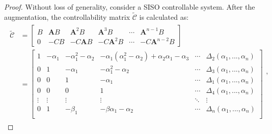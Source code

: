 \documentclass[a4paper,11pt]{book}
\numberwithin{figure}{chapter}
\numberwithin{equation}{chapter}
\numberwithin{table}{chapter}
\theoremstyle{definition}
\begin{document}
\begin{proof}
    Without loss of generality, consider a SISO controllable system. After the augmentation, the controllability matrix $\tilde{\bm{\mathcal{C}}}$ is calculated as:
    \begin{align}
    \begin{split}
        \tilde{\bm{\mathcal{C}}} &= \begin{bmatrix}
            B & \bm{A} B & \bm{A}^2 B & \bm{A}^3 B & \cdots & \bm{A}^{n-1} B \\
            0 & -C B & -C \bm{A} B & -C \bm{A}^2 B & \cdots & -C \bm{A}^{n-2} B
        \end{bmatrix} \\
        &=
            \begin{bmatrix}
                1 & -\alpha_1 & -\alpha_1^2 - \alpha_2 & -\alpha_1(\alpha_1^2 - \alpha_2) + \alpha_2 \alpha_1 - \alpha_3 & \cdots & \Delta_2(\alpha_1,...,\alpha_n) \\
                0 & 1 & -\alpha_1 & -\alpha_1^2 - \alpha_2  & \cdots & \Delta_3(\alpha_1,...,\alpha_n) \\
                0 & 0 & 1 & -\alpha_1  & \cdots & \Delta_1(\alpha_1,...,\alpha_n) \\
                0 & 0 & 0 & 1 &  \cdots & \Delta_4(\alpha_1,...,\alpha_n) \\
                \vdots & \vdots & \vdots & \vdots & \ddots & \vdots \\
                0 & 1 & -\beta_1 & -\beta\alpha_1 - \alpha_2  & \cdots & \Delta_n(\alpha_1,...,\alpha_n) \\
            \end{bmatrix}
    \end{split}
    ,\end{align}
    

\end{proof}
\end{document}
